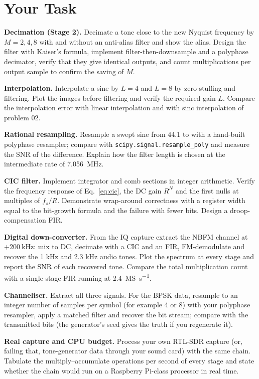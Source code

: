 \documentclass[11pt,a4paper]{article}
\begin{document}
\section*{Your Task}
\begin{tasks}
  \item \textbf{Decimation (Stage 2).} Decimate a tone close to the new Nyquist frequency by $M=2,4,8$ with and without an anti-alias filter and show the alias. Design the filter with Kaiser's formula, implement filter-then-downsample and a polyphase decimator, verify that they give identical outputs, and count multiplications per output sample to confirm the saving of $M$.
  \item \textbf{Interpolation.} Interpolate a sine by $L=4$ and $L=8$ by zero-stuffing and filtering. Plot the images before filtering and verify the required gain $L$. Compare the interpolation error with linear interpolation and with sinc interpolation of problem 02.
  \item \textbf{Rational resampling.} Resample a swept sine from $44.1$ to  with a hand-built polyphase resampler; compare with \texttt{scipy.signal.resample\_poly} and measure the SNR of the difference. Explain how the filter length is chosen at the intermediate rate of \SI{7.056}{\mega\hertz}.
  \item \textbf{CIC filter.} Implement integrator and comb sections in integer arithmetic. Verify the frequency response of Eq.~\eqref{eq:cic}, the DC gain $R^N$ and the first nulls at multiples of $f_s/R$. Demonstrate wrap-around correctness with a register width equal to the bit-growth formula and the failure with fewer bits. Design a droop-compensation FIR.
  \item \textbf{Digital down-converter.} From the IQ capture extract the NBFM channel at $+\SI{200}{\kilo\hertz}$: mix to DC, decimate with a CIC and an FIR, FM-demodulate and recover the 1 kHz and 2.3 kHz audio tones. Plot the spectrum at every stage and report the SNR of each recovered tone. Compare the total multiplication count with a single-stage FIR running at \SI{2.4}{\mega S\per\second}.
  \item \textbf{Channeliser.} Extract all three signals. For the BPSK data, resample to an integer number of samples per symbol (for example 4 or 8) with your polyphase resampler, apply a matched filter and recover the bit stream; compare with the transmitted bits (the generator's seed gives the truth if you regenerate it).
  \item \textbf{Real capture and CPU budget.} Process your own RTL-SDR capture (or, failing that, tone-generator data through your sound card) with the same chain. Tabulate the multiply--accumulate operations per second of every stage and state whether the chain would run on a Raspberry Pi-class processor in real time.
\end{tasks}
\end{document}
